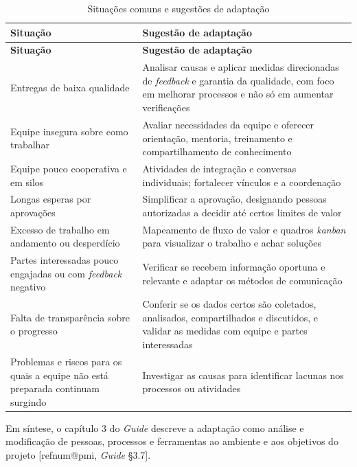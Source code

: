 \documentclass[12pt,a4paper,article,oneside,english,brazil]{abntex2}
\makeatletter
\newcommand{\fontetab}[1]{\par\vspace{3pt}{\small\noindent Fonte: #1\par}}
\newcommand{\refnum}[1]{\csname refnum@#1\endcsname}
\newcommand{\cit}[1]{[\refnum{#1}]}
\makeatother
\begin{document}
\begingroup\SingleSpacing\small
\begin{longtable}{@{}>{\raggedright\arraybackslash}p{}>{\raggedright\arraybackslash}p{}@{}}
\caption{Situações comuns e sugestões de adaptação}\label{tab:t11}\\
\hline
\textbf{Situação} & \textbf{Sugestão de adaptação}\\
\hline
\endfirsthead
\hline
\textbf{Situação} & \textbf{Sugestão de adaptação}\\
\hline
\endhead
\hline
\endfoot
\hline
\endlastfoot
Entregas de baixa qualidade & Analisar causas e aplicar medidas direcionadas de \textit{feedback} e garantia da qualidade, com foco em melhorar processos e não só em aumentar verificações\\[3pt]
Equipe insegura sobre como trabalhar & Avaliar necessidades da equipe e oferecer orientação, mentoria, treinamento e compartilhamento de conhecimento\\[3pt]
Equipe pouco cooperativa e em silos & Atividades de integração e conversas individuais; fortalecer vínculos e a coordenação\\[3pt]
Longas esperas por aprovações & Simplificar a aprovação, designando pessoas autorizadas a decidir até certos limites de valor\\[3pt]
Excesso de trabalho em andamento ou desperdício & Mapeamento de fluxo de valor e quadros \textit{kanban} para visualizar o trabalho e achar soluções\\[3pt]
Partes interessadas pouco engajadas ou com \textit{feedback} negativo & Verificar se recebem informação oportuna e relevante e adaptar os métodos de comunicação\\[3pt]
Falta de transparência sobre o progresso & Conferir se os dados certos são coletados, analisados, compartilhados e discutidos, e validar as medidas com equipe e partes interessadas\\[3pt]
Problemas e riscos para os quais a equipe não está preparada continuam surgindo & Investigar as causas para identificar lacunas nos processos ou atividades\\[3pt]
\end{longtable}
\endgroup
\fontetab{Elaborado pelos autores (2026), com base em \cit{pmi}.}

Em síntese, o capítulo 3 do \textit{Guide} descreve a adaptação como análise e modificação de pessoas, processos e ferramentas ao ambiente e aos objetivos do projeto [\refnum{pmi}, \textit{Guide} §3.7].
\end{document}
